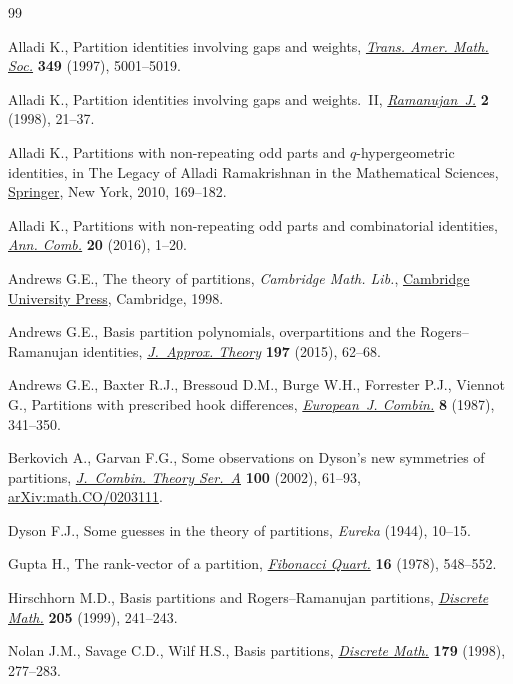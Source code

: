 \documentclass[pdftex]{sigma}
\numberwithin{equation}{section}
\theoremstyle{definition}
\begin{document}
\begin{thebibliography}{99}
\footnotesize\itemsep=0pt

Alladi K., Partition identities involving gaps and weights,
 \href{https://doi.org/10.1090/S0002-9947-97-01831-X}{\textit{Trans. Amer.
 Math. Soc.}} \textbf{349} (1997), 5001--5019.

Alladi K., Partition identities involving gaps and weights.~{II},
 \href{https://doi.org/10.1023/A:1009749606406}{\textit{Ramanujan~J.}}
 \textbf{2} (1998), 21--37.

Alladi K., Partitions with non-repeating odd parts and {$q$}-hypergeometric
 identities, in The Legacy of {A}lladi {R}amakrishnan in the Mathematical
 Sciences, \href{https://doi.org/10.1007/978-1-4419-6263-8_9}{Springer}, New
 York, 2010, 169--182.

Alladi K., Partitions with non-repeating odd parts and combinatorial
 identities, \href{https://doi.org/10.1007/s00026-015-0291-8}{\textit{Ann.
 Comb.}} \textbf{20} (2016), 1--20.

Andrews G.E., The theory of partitions, \textit{Cambridge Math. Lib.},
 \href{https://doi.org/10.1017/CBO9780511608650}{Cambridge University Press},
 Cambridge, 1998.

Andrews G.E., Basis partition polynomials, overpartitions and the
 {R}ogers--{R}amanujan identities,
 \href{https://doi.org/10.1016/j.jat.2014.05.008}{\textit{J.~Approx. Theory}}
 \textbf{197} (2015), 62--68.

Andrews G.E., Baxter R.J., Bressoud D.M., Burge W.H., Forrester P.J., Viennot
 G., Partitions with prescribed hook differences,
 \href{https://doi.org/10.1016/S0195-6698(87)80041-0}{\textit{European~J. Combin.}} \textbf{8} (1987), 341--350.

Berkovich A., Garvan F.G., Some observations on {D}yson's new symmetries of
 partitions, \href{https://doi.org/10.1006/jcta.2002.3281}{\textit{J.~Combin.
 Theory Ser.~A}} \textbf{100} (2002), 61--93,
 \href{http://arxiv.org/abs/math.CO/0203111}{arXiv:math.CO/0203111}.

Dyson F.J., Some guesses in the theory of partitions, \textit{Eureka} (1944),
 10--15.

Gupta H., The rank-vector of a partition,
 \href{https://doi.org/10.1080/00150517.1978.12430283}{\textit{Fibonacci
 Quart.}} \textbf{16} (1978), 548--552.

Hirschhorn M.D., Basis partitions and {R}ogers--{R}amanujan partitions,
 \href{https://doi.org/10.1016/S0012-365X(99)00030-8}{\textit{Discrete Math.}}
 \textbf{205} (1999), 241--243.

Nolan J.M., Savage C.D., Wilf H.S., Basis partitions,
 \href{https://doi.org/10.1016/S0012-365X(97)00101-5}{\textit{Discrete Math.}}
 \textbf{179} (1998), 277--283.

\end{thebibliography}\LastPageEnding
\end{document}
